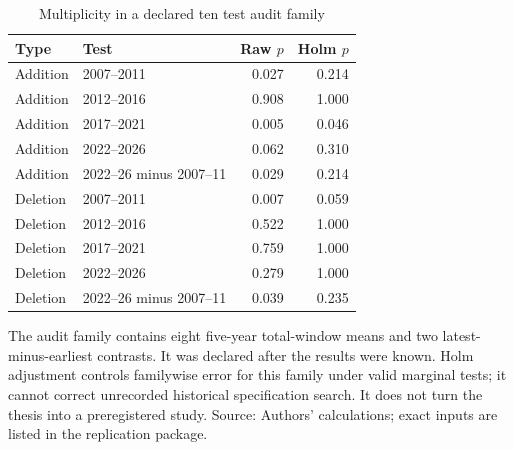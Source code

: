 \begin{table}[!htbp]
\centering
\caption{Multiplicity in a declared ten test audit family}\label{tab:multiplicity}
\small
\setlength{\tabcolsep}{5pt}
\begin{tabular}{llrr}
\toprule
Type & Test & Raw $p$ & Holm $p$ \\
\midrule
Addition & 2007--2011 & 0.027 & 0.214 \\
Addition & 2012--2016 & 0.908 & 1.000 \\
Addition & 2017--2021 & 0.005 & 0.046 \\
Addition & 2022--2026 & 0.062 & 0.310 \\
Addition & 2022--26 minus 2007--11 & 0.029 & 0.214 \\
Deletion & 2007--2011 & 0.007 & 0.059 \\
Deletion & 2012--2016 & 0.522 & 1.000 \\
Deletion & 2017--2021 & 0.759 & 1.000 \\
Deletion & 2022--2026 & 0.279 & 1.000 \\
Deletion & 2022--26 minus 2007--11 & 0.039 & 0.235 \\
\bottomrule
\end{tabular}
\begin{minipage}{\linewidth}\footnotesize\vspace{5pt}
The audit family contains eight five-year total-window means and two latest-minus-earliest contrasts. It was declared after the results were known. Holm adjustment controls familywise error for this family under valid marginal tests; it cannot correct unrecorded historical specification search. It does not turn the thesis into a preregistered study. Source: Authors' calculations; exact inputs are listed in the replication package.
\end{minipage}
\end{table}
